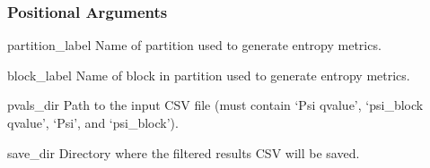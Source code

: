 \documentclass[letterpaper,10pt,english]{sphinxmanual}
\begin{document}
\begin{sphinxVerbatim}[commandchars=\\\{\}]
  \PYG{p}{[}\PYG{p}{]} \PYG{p}{[} \PYG{p}{]} \PYG{p}{[} \PYG{p}{]} \PYG{p}{[} \PYG{p}{]}
                                  
\end{sphinxVerbatim}


\subsubsection{Positional Arguments}
\label{\detokenize{cli:positional-arguments_repeat7}}\begin{optionlist}{3cm}
\item [partition\_label]  
\sphinxAtStartPar
Name of partition used to generate entropy metrics.
\item [block\_label]  
\sphinxAtStartPar
Name of block in partition used to generate entropy metrics.
\item [pvals\_dir]  
\sphinxAtStartPar
Path to the input CSV file (must contain ‘Psi q\sphinxhyphen{}value’, ‘psi\_block q\sphinxhyphen{}value’, ‘Psi’, and ‘psi\_block’).
\item [save\_dir]  
\sphinxAtStartPar
Directory where the filtered results CSV will be saved.
\end{optionlist}
\end{document}
